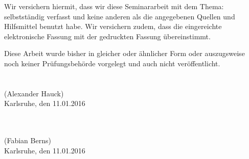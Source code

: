 Wir versichern hiermit, dass wir diese Seminararbeit mit dem Thema: \emph{\titel} selbstständig verfasst und keine anderen als die angegebenen Quellen und Hilfsmittel benutzt habe. Wir versichern zudem, dass die eingereichte elektronische Fassung mit der gedruckten Fassung übereinstimmt.

Diese Arbeit wurde bisher in gleicher oder ähnlicher Form oder auszugsweise noch keiner Prüfungsbehörde vorgelegt und auch nicht veröffentlicht.
\\
\vspace{2cm}
\\
\underline{\hspace{5cm}}\\
\noindent (Alexander Hauck)
\\
\noindent Karlsruhe, den 11.01.2016

\leavevmode
\vspace{2cm}
\\
\underline{\hspace{5cm}}\\
\noindent (Fabian Berns)
\\
\noindent Karlsruhe, den 11.01.2016